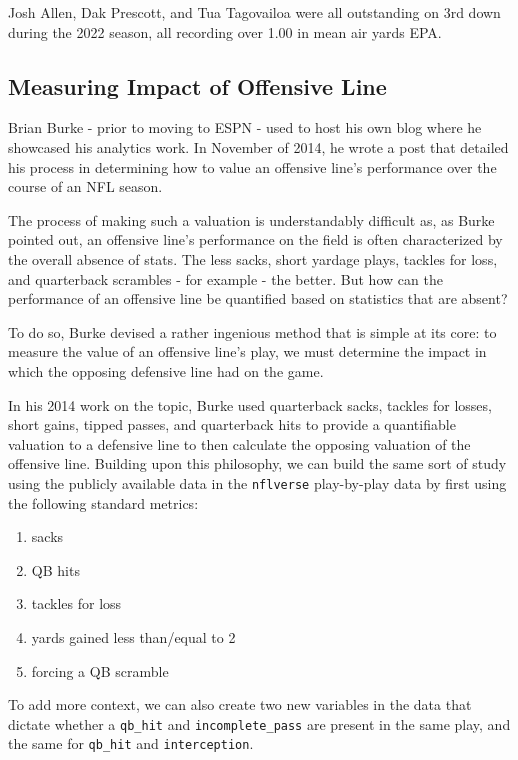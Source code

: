 \documentclass[
  letterpaper,
]{krantz}
\providecommand{\tightlist}{%
  \setlength{\itemsep}{0pt}\setlength{\parskip}{0pt}}\usepackage{longtable,booktabs,array}
\begin{document}
Josh Allen, Dak Prescott, and Tua Tagovailoa were all outstanding on 3rd
down during the 2022 season, all recording over 1.00 in mean air yards
EPA.

\hypertarget{measuring-impact-of-offensive-line}{%
\subsection{Measuring Impact of Offensive
Line}\label{measuring-impact-of-offensive-line}}

Brian Burke - prior to moving to ESPN - used to host his own blog where
he showcased his analytics work. In November of 2014, he wrote a post
that detailed his process in determining how to value an offensive
line's performance over the course of an NFL season.

The process of making such a valuation is understandably difficult as,
as Burke pointed out, an offensive line's performance on the field is
often characterized by the overall absence of stats. The less sacks,
short yardage plays, tackles for loss, and quarterback scrambles - for
example - the better. But how can the performance of an offensive line
be quantified based on statistics that are absent?

To do so, Burke devised a rather ingenious method that is simple at its
core: to measure the value of an offensive line's play, we must
determine the impact in which the opposing defensive line had on the
game.

In his 2014 work on the topic, Burke used quarterback sacks, tackles for
losses, short gains, tipped passes, and quarterback hits to provide a
quantifiable valuation to a defensive line to then calculate the
opposing valuation of the offensive line. Building upon this philosophy,
we can build the same sort of study using the publicly available data in
the \texttt{nflverse} play-by-play data by first using the following
standard metrics:

\begin{enumerate}
\def\labelenumi{\arabic{enumi}.}
\tightlist
\item
  sacks
\item
  QB hits
\item
  tackles for loss
\item
  yards gained less than/equal to 2
\item
  forcing a QB scramble
\end{enumerate}

To add more context, we can also create two new variables in the data
that dictate whether a \texttt{qb\_hit} and \texttt{incomplete\_pass}
are present in the same play, and the same for \texttt{qb\_hit} and
\texttt{interception}.
\end{document}
